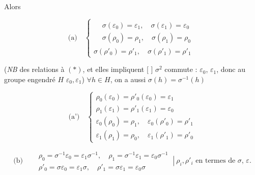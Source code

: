 \documentclass[11pt,a4paper]{article}
\begin{document}
Alors 

\[
\text{(a)} \quad
\begin{cases}
\boxed{\begin{aligned} &\sigma(\varepsilon_0) = \varepsilon_1, \quad \sigma(\varepsilon_1) = \varepsilon_0 \\ &\sigma(\rho_0) = \rho_1, \quad \sigma(\rho_1) = \rho_0 \end{aligned}} \\
\sigma(\rho'_0) = \rho'_1, \quad \sigma(\rho'_1) = \rho'_1
\end{cases}
\]

(\emph{NB} \struck{\ill{}}  des  relations  à $(*)$, et elles impliquent [ \struck{\ill{}}] $\sigma^2$ commute : $\varepsilon_0$, $\varepsilon_1$, donc au groupe engendré  $H$  $\varepsilon_0, \varepsilon_1$) $\forall h \in H$, on a aussi $\sigma(h) = \sigma^{-1}(h)$

\[
\text{(a')} \quad
\begin{cases}
\rho_0(\varepsilon_0) = \rho'_0(\varepsilon_0) = \varepsilon_1 \\
\rho_1(\varepsilon_1) = \rho'_1(\varepsilon_1) = \varepsilon_0 \\[4pt]
\varepsilon_0(\rho_0) = \rho_1, \quad \varepsilon_0(\rho'_0) = \rho'_1 \\
\varepsilon_1(\rho_1) = \rho_0, \quad \varepsilon_1(\rho'_1) = \rho'_0
\end{cases}
\]

\[
\text{(b)} \quad
\begin{aligned}
&\rho_0 = \sigma^{-1}\varepsilon_0 = \varepsilon_1\sigma^{-1}, \quad \rho_1 = \sigma^{-1}\varepsilon_1 = \varepsilon_0\sigma^{-1} \\
&\rho'_0 = \sigma\varepsilon_0 = \varepsilon_1\sigma, \quad \rho'_1 = \sigma\varepsilon_1 = \varepsilon_0\sigma
\end{aligned}
\ \left|\ \text{$\rho_i, \rho'_i$ en termes de $\sigma$, $\varepsilon$.}\right.
\]
\end{document}
